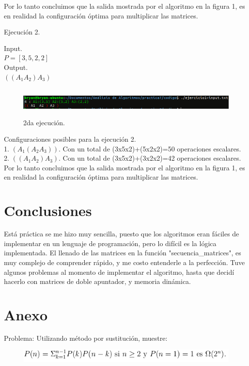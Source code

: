 \documentclass[12pt]{report}
\begin{document}
	Por lo tanto concluimos que la salida mostrada por el algoritmo en la figura 1, es en realidad la configuración óptima para multiplicar las matrices.\newpage
	
	Ejecución 2.
	
	Input.\\
	
	$P=[3,5,2,2]$\\
	
	Output.\\
	
	$((A_{1}A_{2})A_{3})$	
	\begin{figure}[H]
		\includegraphics[height=1.5cm,width=16cm]{imagenes/2.png}
		\centering
		\caption{2da ejecución.}
		\centering
	\end{figure}
	
	Configuraciones posibles para la ejecución 2.\\
	1. $(A_{1}(A_{2}A_{3}))$. Con un total de (3x5x2)+(5x2x2)=50 operaciones escalares.\\
	2. $((A_{1}A_{2})A_{3})$. Con un total de (3x5x2)+(3x2x2)=42 operaciones escalares.\\
	
	Por lo tanto concluimos que la salida mostrada por el algoritmo en la figura 1, es en realidad la configuración óptima para multiplicar las matrices.\newpage
	
	
\section{Conclusiones}
Está práctica se me hizo muy sencilla, puesto que los algoritmos eran fáciles de implementar en un lenguaje de programación, pero lo difícil es la lógica implementada. El llenado de las matrices en la función "secuencia\_matrices", es muy complejo de comprender rápido, y me costo entenderle a la perfección. \newline
Tuve algunos problemas al momento de implementar el algoritmo, hasta que decidí hacerlo con matrices de doble apuntador, y memoria dinámica.\newpage 


\section{Anexo}

Problema: Utilizando método por sustitución, muestre:
	\begin{figure}[H]
		\includegraphics[width=16cm]{imagenes/3.png}
	\end{figure}
	
\end{document}
